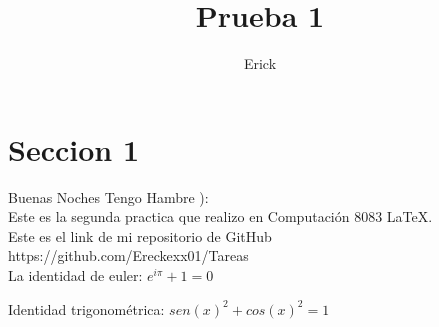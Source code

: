 \documentclass[a4paper,10pt]{article}
\title{Prueba 1} %
\author{Erick} %
\begin{document}
\maketitle

% 

\section{Seccion 1}

Buenas Noches Tengo Hambre ):\\ %

Este es la segunda practica que realizo en Computación 8083 \LaTeX.\\ 
Este es el link de mi repositorio de GitHub https://github.com/Ereckexx01/Tareas \\

La identidad de euler: $ e^{i \pi} + 1 = 0 $  %

Identidad trigonométrica: $ sen(x)^2 + cos(x)^2 = 1 $ 
\end{document}
